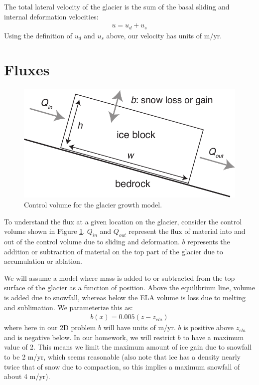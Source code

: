 \documentclass[11pt, oneside]{article}   	%
\begin{document}
The total lateral velocity of the glacier is the sum of the basal sliding and internal deformation velocities:
\begin{eqnarray}
	u = u_d + u_s
\end{eqnarray}
Using the definition of $u_d $ and $u_s$ above, our velocity has units of m/yr.

\section*{Fluxes} 
\begin{figure}[htbp]
\begin{center}
\includegraphics[width=.6\textwidth]{block.pdf}
\caption{Control volume for the glacier growth model.}
\label{controlVolume}
\end{center}
\end{figure}

To understand the flux at a given location on the glacier, consider the control volume shown in Figure \ref{controlVolume}.  $Q_{in}$ and $Q_{out}$ represent the flux of material into and out of the control volume due to sliding and deformation. $b$ represents the addition or subtraction of material on the top part of the glacier due to accumulation or ablation.

We will assume a model where mass is added to or subtracted from the top surface of the glacier as a function of position. Above the equilibrium line, volume is added due to snowfall, whereas below the ELA volume is loss due to melting and sublimation. We parameterize this as:
\begin{eqnarray}
	b(x) = 0.005 (z- z_{ela}) 
	\label{eq:b}
\end{eqnarray}
where here in our 2D problem $b$ will have units of m/yr. $b$ is positive above $z_{ela}$ and is negative below.  In our homework, we will restrict $b$ to have a maximum value of 2. This means we limit the maximum amount of ice gain due to snowfall to be 2 m/yr, which seems reasonable (also note that ice has a density nearly twice that of snow due to compaction, so this implies a maximum snowfall of about 4 m/yr).
\end{document}
